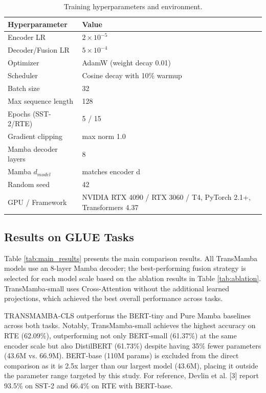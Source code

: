 \documentclass[runningheads]{llncs}
\begin{document}
\begin{table}[h]
\centering
\caption{Training hyperparameters and environment.}
\label{tab:hyperparams}
\begin{tabular}{ll}
\toprule
\textbf{Hyperparameter} & \textbf{Value} \\
\midrule
Encoder LR & $2\times10^{-5}$ \\
Decoder/Fusion LR & $5\times10^{-4}$ \\
Optimizer & AdamW (weight decay 0.01) \\
Scheduler & Cosine decay with 10\% warmup \\
Batch size & 32 \\
Max sequence length & 128 \\
Epochs (SST-2/RTE) & 5 / 15 \\
Gradient clipping & max norm 1.0 \\
Mamba decoder layers & 8 \\
Mamba $d_{model}$ & matches encoder d \\
Random seed & 42 \\
GPU / Framework & NVIDIA RTX 4090 / RTX 3060 / T4, PyTorch 2.1+, Transformers 4.37 \\
\bottomrule
\end{tabular}
\end{table}

\subsection{Results on GLUE Tasks}
Table \ref{tab:main_results} presents the main comparison results. All TransMamba models use an 8-layer Mamba decoder; the best-performing fusion strategy is selected for each model scale based on the ablation results in Table \ref{tab:ablation}. TransMamba-small uses Cross-Attention without the additional learned projections, which achieved the best overall performance across tasks.

TRANSMAMBA-CLS outperforms the BERT-tiny and Pure Mamba baselines across both tasks. Notably, TransMamba-small achieves the highest accuracy on RTE (62.09\%), outperforming not only BERT-small (61.37\%) at the same encoder scale but also DistilBERT (61.73\%) despite having 35\% fewer parameters (43.6M vs. 66.9M). BERT-base (110M params) is excluded from the direct comparison as it is 2.5x larger than our largest model (43.6M), placing it outside the parameter range targeted by this study. For reference, Devlin et al. [3] report 93.5\% on SST-2 and 66.4\% on RTE with BERT-base.
\end{document}
